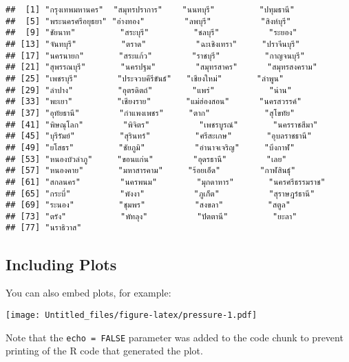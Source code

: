 \documentclass[]{article}
\begin{document}
\begin{verbatim}
##  [1] "กรุงเทพมหานคร"  "สมุทรปราการ"    "นนทบุรี"         "ปทุมธานี"       
##  [5] "พระนครศรีอยุธยา" "อ่างทอง"        "ลพบุรี"          "สิงห์บุรี"        
##  [9] "ชัยนาท"         "สระบุรี"         "ชลบุรี"          "ระยอง"        
## [13] "จันทบุรี"         "ตราด"          "ฉะเชิงเทรา"     "ปราจีนบุรี"      
## [17] "นครนายก"       "สระแก้ว"        "ราชบุรี"         "กาญจนบุรี"      
## [21] "สุพรรณบุรี"       "นครปฐม"        "สมุทรสาคร"      "สมุทรสงคราม"   
## [25] "เพชรบุรี"        "ประจวบคีรีขันธ์"   "เชียงใหม่"       "ลำพูน"         
## [29] "ลำปาง"         "อุตรดิตถ์"        "แพร่"           "น่าน"          
## [33] "พะเยา"         "เชียงราย"       "แม่ฮ่องสอน"      "นครสวรรค์"     
## [37] "อุทัยธานี"        "กำแพงเพชร"     "ตาก"           "สุโขทัย"        
## [41] "พิษณุโลก"        "พิจิตร"          "เพชรบูรณ์"       "นครราชสีมา"    
## [45] "บุรีรัมย์"         "สุรินทร์"         "ศรีสะเกษ"       "อุบลราชธานี"    
## [49] "ยโสธร"         "ชัยภูมิ"          "อำนาจเจริญ"     "บึงกาฬ"        
## [53] "หนองบัวลำภู"     "ขอนแก่น"        "อุดรธานี"        "เลย"          
## [57] "หนองคาย"       "มหาสารคาม"     "ร้อยเอ็ด"        "กาฬสินธุ์"       
## [61] "สกลนคร"        "นครพนม"        "มุกดาหาร"       "นครศรีธรรมราช" 
## [65] "กระบี่"          "พังงา"          "ภูเก็ต"          "สุราษฎร์ธานี"    
## [69] "ระนอง"         "ชุมพร"          "สงขลา"         "สตูล"          
## [73] "ตรัง"           "พัทลุง"          "ปัตตานี"         "ยะลา"         
## [77] "นราธิวาส"
\end{verbatim}

\hypertarget{including-plots}{%
\subsection{Including Plots}\label{including-plots}}

You can also embed plots, for example:

\texttt{[image: Untitled\_files/figure-latex/pressure-1.pdf]}

Note that the \texttt{echo\ =\ FALSE} parameter was added to the code
chunk to prevent printing of the R code that generated the plot.
\end{document}
